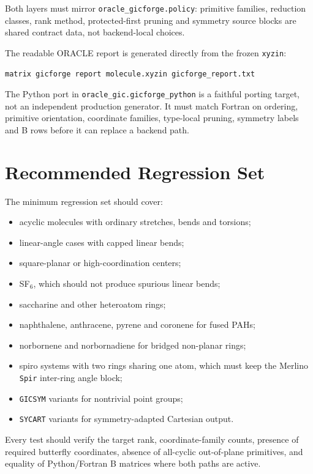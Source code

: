 \documentclass[11pt]{article}
\newcommand{\xyzin}{\texttt{xyzin}}
\begin{document}
\noindent
Both layers must mirror \texttt{oracle\_gicforge.policy}: primitive families,
reduction classes, rank method, protected-first pruning and symmetry source
blocks are shared contract data, not backend-local choices.

\noindent
The readable ORACLE report is generated directly from the frozen \xyzin{}:

\begin{lstlisting}[style=oracle]
matrix gicforge report molecule.xyzin gicforge_report.txt
\end{lstlisting}

\noindent
The Python port in \texttt{oracle\_gic.gicforge\_python} is a faithful porting
target, not an independent production generator.  It must match Fortran on
ordering, primitive orientation, coordinate families, type-local pruning,
symmetry labels and B rows before it can replace a backend path.

\section{Recommended Regression Set}

The minimum regression set should cover:

\begin{itemize}
  \item acyclic molecules with ordinary stretches, bends and torsions;
  \item linear-angle cases with capped linear bends;
  \item square-planar or high-coordination centers;
  \item SF\(_6\), which should not produce spurious linear bends;
  \item saccharine and other heteroatom rings;
  \item naphthalene, anthracene, pyrene and coronene for fused PAHs;
  \item norbornene and norbornadiene for bridged non-planar rings;
  \item spiro systems with two rings sharing one atom, which must keep the
        Merlino \texttt{Spir} inter-ring angle block;
  \item \texttt{GICSYM} variants for nontrivial point groups;
  \item \texttt{SYCART} variants for symmetry-adapted Cartesian output.
\end{itemize}

\noindent
Every test should verify the target rank, coordinate-family counts, presence of
required butterfly coordinates, absence of all-cyclic out-of-plane primitives,
and equality of Python/Fortran B matrices where both paths are active.
\end{document}
